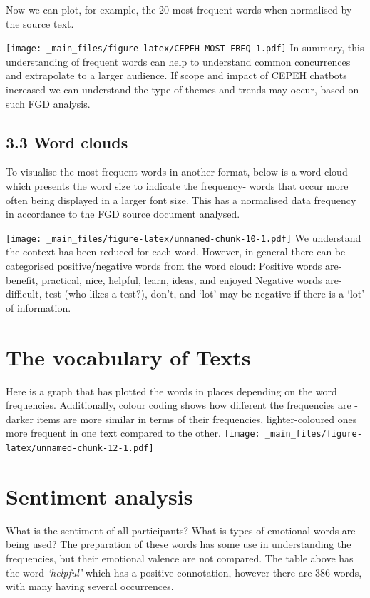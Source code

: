 \documentclass[a4paper, nobind]{templates/ociamthesis}
\begin{document}
Now we can plot, for example, the 20 most frequent words when normalised by the source text.

\texttt{[image: \_main\_files/figure-latex/CEPEH MOST FREQ-1.pdf]}
In summary, this understanding of frequent words can help to understand common concurrences and extrapolate to a larger audience. If scope and impact of CEPEH chatbots increased we can understand the type of themes and trends may occur, based on such FGD analysis.

\hypertarget{word-clouds}{%
\subsection{3.3 Word clouds}\label{word-clouds}}

To visualise the most frequent words in another format, below is a word cloud which presents the word size to indicate the frequency- words that occur more often being displayed in a larger font size.
This has a normalised data frequency in accordance to the FGD source document analysed.

\texttt{[image: \_main\_files/figure-latex/unnamed-chunk-10-1.pdf]}
We understand the context has been reduced for each word. However, in general there can be categorised positive/negative words from the word cloud:
Positive words are- benefit, practical, nice, helpful, learn, ideas, and enjoyed
Negative words are- difficult, test (who likes a test?), don't, and `lot' may be negative if there is a `lot' of information.

\hypertarget{the-vocabulary-of-texts}{%
\section{The vocabulary of Texts}\label{the-vocabulary-of-texts}}

Here is a graph that has plotted the words in places depending on the word frequencies. Additionally, colour coding shows how different the frequencies are - darker items are more similar in terms of their frequencies, lighter-coloured ones more frequent in one text compared to the other.
\texttt{[image: \_main\_files/figure-latex/unnamed-chunk-12-1.pdf]}

\hypertarget{sentiment-analysis}{%
\section{Sentiment analysis}\label{sentiment-analysis}}

What is the sentiment of all participants? What is types of emotional words are being used?
The preparation of these words has some use in understanding the frequencies, but their emotional valence are not compared. The table above has the word \emph{`helpful'} which has a positive connotation, however there are 386 words, with many having several occurrences.
\end{document}
